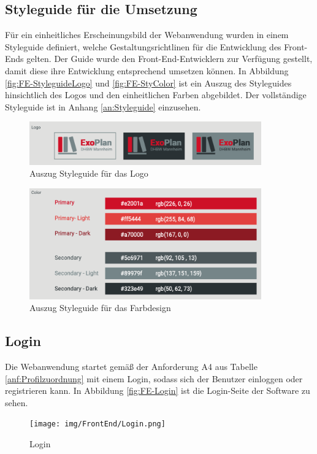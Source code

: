 \subsection{Styleguide für die Umsetzung}
Für ein einheitliches Erscheinungsbild der Webanwendung wurden in einem Styleguide definiert, welche Gestaltungsrichtlinen für die Entwicklung des Front-Ends gelten. 
Der Guide wurde den Front-End-Entwicklern zur Verfügung gestellt, damit diese ihre Entwicklung entsprechend umsetzen können. 
In Abbildung \vref{fig:FE-StyleguideLogo} und \vref{fig:FE-StyColor} ist ein Auszug des Styleguides hinsichtlich des Logos und den einheitlichen Farben abgebildet.
Der vollständige Styleguide ist in Anhang \vref{an:Styleguide} einzusehen.
\begin{figure}[H]
	\centering 
	\includegraphics[width=10cm]{img/FrontEnd/StyLogo.png}
	\caption[Auszug Styleguide für das Logo]{\label{fig:FE-StyleguideLogo}Auszug Styleguide für das Logo}
\end{figure}

\begin{figure}[H]
	\centering 
	\includegraphics[width=10cm]{img/FrontEnd/StyColor.png}
	\caption[Auszug Styleguide für das Farbdesign]{\label{fig:FE-StyColor}Auszug Styleguide für das Farbdesign}
\end{figure}

\subsection{Login}
Die Webanwendung startet gemäß der Anforderung A4 aus Tabelle \vref{anf:Profilzuordnung} mit einem Login, sodass sich der Benutzer einloggen oder registrieren kann. 
In Abbildung \vref{fig:FE-Login} ist die Login-Seite der Software zu sehen.
\begin{figure}[H]
	\centering 
	\texttt{[image: img/FrontEnd/Login.png]}
	\caption[Login]{\label{fig:FE-Login}Login}
\end{figure}

